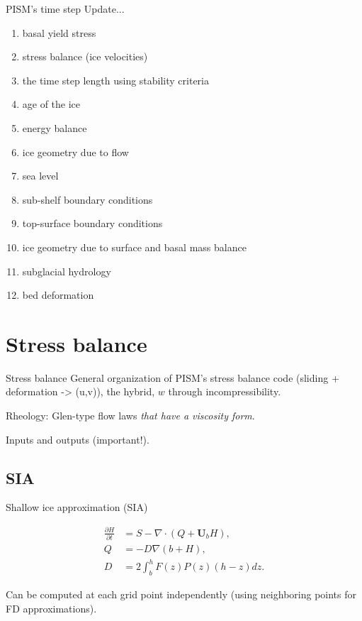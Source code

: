 \documentclass[hide notes,intlimits]{beamer}
\begin{document}
\begin{frame}{PISM's time step}
  Update...
  \begin{enumerate}
  \item basal yield stress
  \item stress balance (ice velocities)
  \item the time step length using stability criteria
  \item age of the ice
  \item energy balance
  \item ice geometry due to flow
  \item sea level
  \item sub-shelf boundary conditions
  \item top-surface boundary conditions
  \item ice geometry due to surface and basal mass balance
  \item subglacial hydrology
  \item bed deformation
  \end{enumerate}
\end{frame}

\section{Stress balance}
\label{sec:stress-balance}

\begin{frame}{Stress balance}
  General organization of PISM's stress balance code (sliding +
  deformation -> (u,v)), the hybrid, $w$ through incompressibility.

  Rheology: Glen-type flow laws \emph{that have a viscosity form}.

  Inputs and outputs (important!).
\end{frame}


\subsection{SIA}
\label{sec:sia}

\begin{frame}{Shallow ice approximation (SIA)}

  \begin{align}
    \label{eq:2}
    \frac{\partial H}{\partial t} &= S - \nabla \cdot (Q + \mathbf{U}_b H),\\
    Q &= -D \nabla (b + H),\\
    D &= 2\int_b^h F(z)P(z)(h-z)dz.
  \end{align}

  Can be computed at each grid point independently (using neighboring
  points for FD approximations).

\end{frame}
\end{document}
